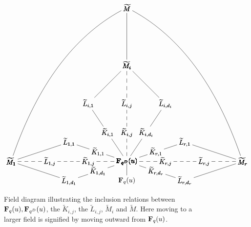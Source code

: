 \documentclass[a4paper]{compositio}
\begin{document}
\begin{figure}
\[
\xy (0,0)*+{};(0,-10)*+{\F_{q}(u)}**\dir{-};
(0,0)*+{\F_{q^{D}}(u)};(-15,5)*+{\widetilde{K}_{1,1}}**\dir{-};
(-15,5)*+{\widetilde{K}_{1,1}};(-30,10)*+{\widetilde{L}_{1,1}}**\dir{-};
(0,0)*+{\F_{q^{D}}(u)};(-20,0)*+{\widetilde{K}_{1,j}}**\dir{--};
(-20,0)*+{\widetilde{K}_{1,j}};(-40,0)*+{\widetilde{L}_{1,j}}**\dir{--};
(0,0)*+{\F_{q^{D}}(u)};(-15,-5)*+{\widetilde{K}_{1,d_1}}**\dir{-};
(-15,-5)*+{\widetilde{K}_{1,d_1}};(-30,-10)*+{\widetilde{L}_{1,d_1}}**\dir{-};
(-60,0)*+{\widetilde{M}_{1}};(-30,-10)*+{\widetilde{L}_{1,d_1}}**\dir{-};
(-60,0)*+{\widetilde{M}_{1}};(-40,0)*+{\widetilde{L}_{1,j}}**\dir{--};
(-60,0)*+{\widetilde{M}_{1}};(-30,10)*+{\widetilde{L}_{1,1}}**\dir{-};
(0,0)*+{\F_{q^{D}}(u)};(15,5)*+{\widetilde{K}_{r,1}}**\dir{-};
(15,5)*+{\widetilde{K}_{r,1}};(30,10)*+{\widetilde{L}_{r,1}}**\dir{-};
(0,0)*+{\F_{q^{D}}(u)};(20,0)*+{\widetilde{K}_{r,j}}**\dir{--};
(20,0)*+{\widetilde{K}_{r,j}};(40,0)*+{\widetilde{L}_{r,j}}**\dir{--};
(0,0)*+{\F_{q^{D}}(u)};(15,-5)*+{\widetilde{K}_{r,d_r}}**\dir{-};
(15,-5)*+{\widetilde{K}_{r,d_r}};(30,-10)*+{\widetilde{L}_{r,d_r}}**\dir{-};
(60,0)*+{\widetilde{M}_{r}};(30,-10)*+{\widetilde{L}_{r,d_r}}**\dir{-};
(60,0)*+{\widetilde{M}_{r}};(40,0)*+{\widetilde{L}_{r,j}}**\dir{--};
(60,0)*+{\widetilde{M}_{r}};(30,10)*+{\widetilde{L}_{r,1}}**\dir{-};
(0,0)*+{\F_{q^{D}}(u)};(10,15)*+{\widetilde{K}_{i,d_i}}**\dir{-};
(10,15)*+{\widetilde{K}_{i,d_i}};(20,30)*+{\widetilde{L}_{i,d_i}}**\dir{-};
(0,0)*+{\F_{q^{D}}(u)};(0,15)*+{\widetilde{K}_{i,j}}**\dir{--};
(0,15)*+{\widetilde{K}_{i,j}};(0,30)*+{\widetilde{L}_{i,j}}**\dir{--};
(0,0)*+{\F_{q^{D}}(u)};(-10,15)*+{\widetilde{K}_{i,1}}**\dir{-};
(-10,15)*+{\widetilde{K}_{i,1}};(-20,30)*+{\widetilde{L}_{i,1}}**\dir{-};
(-20,30)*+{\widetilde{L}_{i,1}};(0,50)*+{\widetilde{M}_{i}}**\dir{-};
(20,30)*+{\widetilde{L}_{i,d_i}};(0,50)*+{\widetilde{M}_{i}}**\dir{-};
(0,30)*+{\widetilde{L}_{i,j}};(0,50)*+{\widetilde{M}_{i}}**\dir{--};
(0,80)*+{\widetilde{M}};(0,50)*+{\widetilde{M}_{i}}**\dir{-};
(0,80)*+{\widetilde{M}};(-60,0)*+{\widetilde{M}_{1}}**\crv{(-40,60)};
(0,80)*+{\widetilde{M}};(60,0)*+{\widetilde{M}_{r}}**\crv{(40,60)};
\endxy\]
\caption{Field diagram illustrating the inclusion relations between
$\mathbf{F}_{q}(u), \mathbf{F}_{q^{D}}(u)$, the $\widetilde{K}_{i,j}$, the
$\widetilde{L}_{i,j}$, $\widetilde{M}_i$ and $\widetilde{M}$. Here
moving to a larger field is signified by moving outward from
$\mathbf{F}_q(u)$. \label{fig:bigtower}}
\end{figure}
\end{document}

